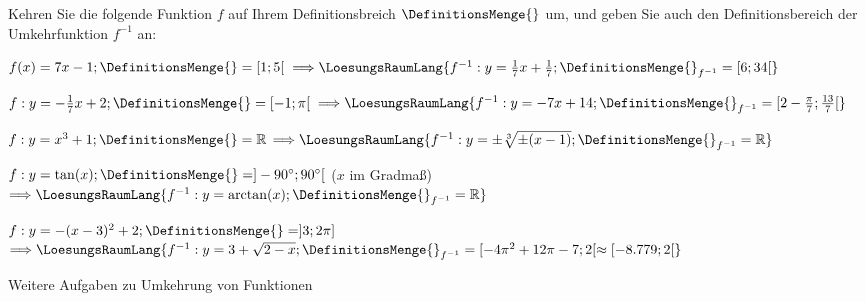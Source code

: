 

\renewcommand{\bbwAufgabenBlockID}{Finv}

\renewcommand{\metaHeaderLine}{Funktionen}
\renewcommand{\arbeitsblattTitel}{Umkehrfunktionen}



\arbeitsblattHeader{}

Kehren Sie die folgende Funktion $f$ auf Ihrem Definitionsbreich
$\DefinitionsMenge{}$ um, und geben Sie auch den Definitionsbereich der
Umkehrfunktion $f^{-1}$ an:


\begin{bbwAufgabenBlock}
\item $f(x) = 7x-1; \DefinitionsMenge{} = [1;5[$
$\Longrightarrow \LoesungsRaumLang{
f^{-1}: y=\frac17 x + \frac17; \DefinitionsMenge{}_{f^{-1}} = [6;34[
}$

\item $f:  y = -\frac17x + 2; \DefinitionsMenge{} = [-1;\pi[$
$\Longrightarrow \LoesungsRaumLang{
f^{-1}: y=-7x+14; \DefinitionsMenge{}_{f^{-1}} = [2-\frac{\pi}{7};\frac{13}{7}[
}$

\item $f:  y = x^3  + 1; \DefinitionsMenge{} = \mathbb{R}$
$\Longrightarrow \LoesungsRaumLang{
f^{-1}: y=\pm\sqrt[3]{\pm(x-1)}; \DefinitionsMenge{}_{f^{-1}} = \mathbb{R}
}$\noTRAINER{\newpage}

\item $f:  y = \tan(x); \DefinitionsMenge{} = ]-90^{\circ};90^{\circ}[$ ($x$ im Gradmaß)
$\Longrightarrow \LoesungsRaumLang{
f^{-1}: y=\arctan(x); \DefinitionsMenge{}_{f^{-1}} = \mathbb{R}
}$

\item $f:  y = -(x-3)^2 + 2; \DefinitionsMenge{} = ]3;2\pi]$
$\Longrightarrow \LoesungsRaumLang{
f^{-1}: y=3+\sqrt{2-x}; \DefinitionsMenge{}_{f^{-1}} = [-4\pi^2+12\pi-7;2[
\approx{} [-8.779;2[
}$

\end{bbwAufgabenBlock}
\noTRAINER{\newpage}



Weitere Aufgaben zu Umkehrung von Funktionen

